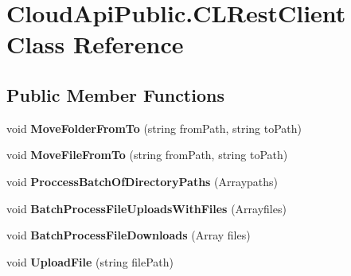 \hypertarget{class_cloud_api_public_1_1_c_l_rest_client}{\section{Cloud\-Api\-Public.\-C\-L\-Rest\-Client Class Reference}
\label{class_cloud_api_public_1_1_c_l_rest_client}
}
\subsection*{Public Member Functions}
\begin{DoxyCompactItemize}
\item 
\hypertarget{class_cloud_api_public_1_1_c_l_rest_client_a72ce3e71b7657c9fccf9e274ecf9e8f0}{void {\bfseries Move\-Folder\-From\-To} (string from\-Path, string to\-Path)}\label{class_cloud_api_public_1_1_c_l_rest_client_a72ce3e71b7657c9fccf9e274ecf9e8f0}

\item 
\hypertarget{class_cloud_api_public_1_1_c_l_rest_client_a38a686832f11e0c5a0847cf608c4fadc}{void {\bfseries Move\-File\-From\-To} (string from\-Path, string to\-Path)}\label{class_cloud_api_public_1_1_c_l_rest_client_a38a686832f11e0c5a0847cf608c4fadc}

\item 
\hypertarget{class_cloud_api_public_1_1_c_l_rest_client_a4383a6710c645559a4d46b6b10f97b1c}{void {\bfseries Proccess\-Batch\-Of\-Directory\-Paths} (Arraypaths)}\label{class_cloud_api_public_1_1_c_l_rest_client_a4383a6710c645559a4d46b6b10f97b1c}

\item 
\hypertarget{class_cloud_api_public_1_1_c_l_rest_client_a069a3fda675bc7d973749c6c0c16a3a8}{void {\bfseries Batch\-Process\-File\-Uploads\-With\-Files} (Arrayfiles)}\label{class_cloud_api_public_1_1_c_l_rest_client_a069a3fda675bc7d973749c6c0c16a3a8}

\item 
\hypertarget{class_cloud_api_public_1_1_c_l_rest_client_acbc1c7c931cb70ac4d52c60b4b1ee538}{void {\bfseries Batch\-Process\-File\-Downloads} (Array files)}\label{class_cloud_api_public_1_1_c_l_rest_client_acbc1c7c931cb70ac4d52c60b4b1ee538}

\item 
\hypertarget{class_cloud_api_public_1_1_c_l_rest_client_ad3d680712cd885e611a717915b4a1b72}{void {\bfseries Upload\-File} (string file\-Path)}\label{class_cloud_api_public_1_1_c_l_rest_client_ad3d680712cd885e611a717915b4a1b72}


\end{DoxyCompactItemize}
